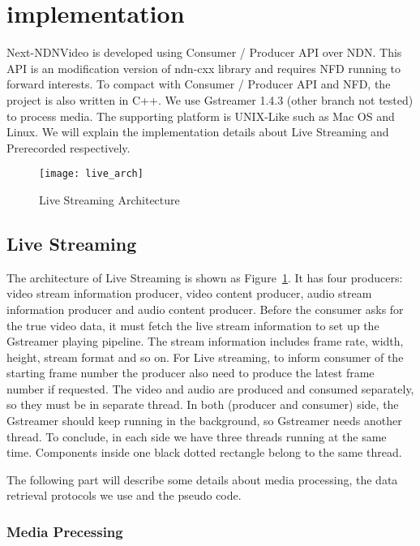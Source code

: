 \section{implementation} %
\label{sec:implementation}
Next-NDNVideo is developed using Consumer / Producer API over NDN. This API is an modification version of ndn-cxx library and requires NFD running to forward interests. To compact with Consumer / Producer API and NFD, the project is also written in C++. We use Gstreamer 1.4.3 (other branch not tested) to process media. The supporting platform is UNIX-Like such as Mac OS and Linux. We will explain the implementation details about Live Streaming and Prerecorded respectively.
\begin{figure}[htbp]
  \centering
  \texttt{[image: live\_arch]}
  \caption{Live Streaming Architecture}
  \label{fig:live_arch}
\end{figure}

\subsection{Live Streaming}
The architecture of Live Streaming is shown as Figure~\ref{fig:live_arch}. It has four producers: video stream information producer, video content producer, audio stream information producer and audio content producer. Before the consumer asks for the true video data, it must fetch the live stream information to set up the Gstreamer playing pipeline. The stream information includes frame rate, width, height, stream format and so on. For Live streaming, to inform consumer of the starting frame number the producer also need to produce the latest frame number if requested. The video and audio are produced and consumed separately, so they must be in separate thread. In both (producer and consumer) side, the Gstreamer should keep running in the background, so Gstreamer needs another thread. To conclude, in each side we have three threads running at the same time. Components inside one black dotted rectangle belong to the same thread.

The following part will describe some details about media processing, the data retrieval protocols we use and the pseudo code.
\subsubsection {Media Precessing}
